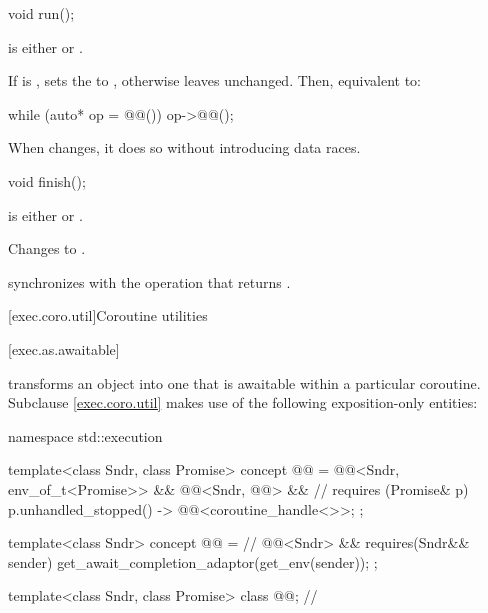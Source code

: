 %
\begin{itemdecl}
void run();
\end{itemdecl}

\begin{itemdescr}
\pnum
\expects
{} is either  or .

\pnum
\effects
If  is ,
sets the  to ,
otherwise leaves  unchanged.
Then, equivalent to:
\begin{codeblock}
while (auto* op = @@()) {
  op->@@();
}
\end{codeblock}

\pnum
\remarks
When  changes, it does so without introducing data races.
\end{itemdescr}

%
\begin{itemdecl}
void finish();
\end{itemdecl}

\begin{itemdescr}
\pnum
\expects
{} is either  or .

\pnum
\effects
Changes  to .

\pnum
\sync
{} synchronizes with the  operation
that returns .
\end{itemdescr}

[exec.coro.util]{Coroutine utilities}

[exec.as.awaitable]{}

\pnum
{} transforms an object into one
that is awaitable within a particular coroutine.
Subclause \ref{exec.coro.util} makes use of
the following exposition-only entities:
\begin{codeblock}
namespace std::execution {
  template<class Sndr, class Promise>
    concept @@ =
      @@<Sndr, env_of_t<Promise>> &&
      @@<Sndr, @@> &&    // \seebelow
      requires (Promise& p) {
        { p.unhandled_stopped() } -> @@<coroutine_handle<>>;
      };

  template<class Sndr>
    concept @@ =            // \expos
      @@<Sndr> &&
      requires(Sndr&& sender) {
        get_await_completion_adaptor(get_env(sender));
      };

  template<class Sndr, class Promise>
    class @@;                                     // \expos
}
\end{codeblock}

